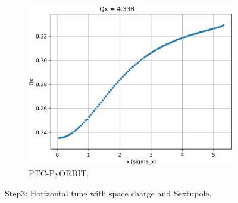 \documentclass[a4paper]{cernatsnote}
\begin{document}
\begin{figure}
\begin{subfigure}{.5\textwidth}
          \includegraphics[width=\textwidth]{Step3_tune_x_PO.png}
          \caption{PTC-PyORBIT.}
          \label{fig:step3H_po}
        \end{subfigure}
        \caption{Step3: Horizontal tune with space charge and Sextupole.}
        \label{fig:step3H}
\end{figure}
\end{document}
